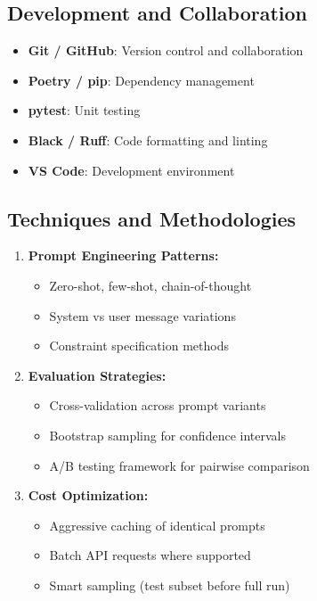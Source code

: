 \documentclass[11pt,a4paper]{article}
\begin{document}
\subsection{Development and Collaboration}

\begin{itemize}[leftmargin=*]
    \item \textbf{Git / GitHub}: Version control and collaboration
    \item \textbf{Poetry / pip}: Dependency management
    \item \textbf{pytest}: Unit testing
    \item \textbf{Black / Ruff}: Code formatting and linting
    \item \textbf{VS Code}: Development environment
\end{itemize}

\subsection{Techniques and Methodologies}

\begin{enumerate}[leftmargin=*]
    \item \textbf{Prompt Engineering Patterns:}
    \begin{itemize}
        \item Zero-shot, few-shot, chain-of-thought
        \item System vs user message variations
        \item Constraint specification methods
    \end{itemize}
    
    \item \textbf{Evaluation Strategies:}
    \begin{itemize}
        \item Cross-validation across prompt variants
        \item Bootstrap sampling for confidence intervals
        \item A/B testing framework for pairwise comparison
    \end{itemize}
    
    \item \textbf{Cost Optimization:}
    \begin{itemize}
        \item Aggressive caching of identical prompts
        \item Batch API requests where supported
        \item Smart sampling (test subset before full run)
    \end{itemize}
\end{enumerate}
\end{document}
